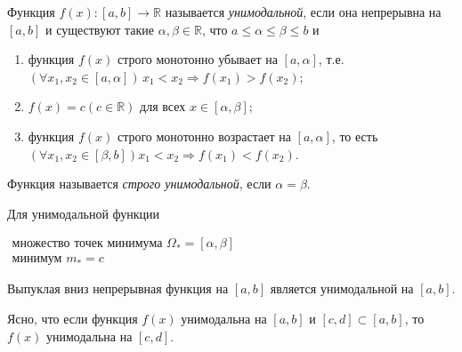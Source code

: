 
\begin{definition}
	Функция $f(x): [a, b] \to \mathbb{R}$ называется \textit{унимодальной}, если она непрерывна на $[a, b]$ и существуют такие $\alpha, \beta \in \mathbb{R}$, что $a \leqslant \alpha \leqslant \beta \leqslant b$ и 
	\begin{enumerate}[label={\arabic*)}]
		\item функция $f(x)$ строго монотонно убывает на $[a, \alpha]$, т.е. $(\forall x_1, x_2 \in [a, \alpha]) \, x_1 < x_2 \Rightarrow f(x_1) > f(x_2)$;
		
		\item $f(x) = c (c \in \mathbb{R})$ для всех $x \in [\alpha, \beta]$;
		
		\item функция $f(x)$ строго монотонно возрастает на $[a, \alpha]$, то есть $(\forall x_1, x_2 \in [\beta, b]) x_1 < x_2 \Rightarrow f(x_1) < f(x_2)$.
	\end{enumerate}
	
	Функция называется \textit{строго унимодальной}, если $\alpha = \beta$.
\end{definition}

\begin{utv}
	Для унимодальной функции
	
	$\begin{array}{l}
		\text{множество точек минимума } \Omega_{\ast} = [\alpha, \beta] \\
		\text{минимум } m_{\ast} = c
	\end{array}$
\end{utv}

\begin{utv}
	Выпуклая вниз непрерывная функция на $[a, b]$ является унимодальной на $[a, b]$.
\end{utv}

\begin{utv}
	Ясно, что если функция $f(x)$ унимодальна на $[a, b]$ и $[c, d] \subset [a, b]$, то $f(x)$ унимодальна на $[c, d]$. 
\end{utv}

